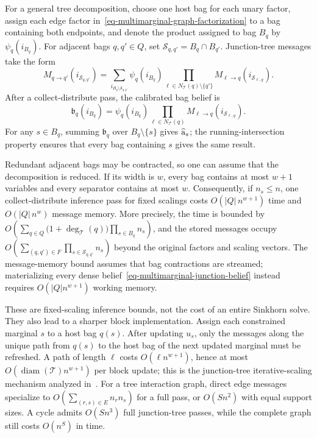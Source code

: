 For a general tree decomposition, choose one host bag for each unary factor, assign each edge factor in~\eqref{eq-multimarginal-graph-factorization} to a bag containing both endpoints, and denote the product assigned to bag $B_q$ by $\psi_q(i_{B_q})$. For adjacent bags $q,q'\in Q$, set $\mathcal S_{q,q'}=B_q\cap B_{q'}$. Junction-tree messages take the form
\begin{equation}\label{eq-multimarginal-junction-message}
	M_{q\to q'}(i_{\mathcal S_{q,q'}})
	=
	\sum_{i_{B_q\setminus\mathcal S_{q,q'}}}
	\psi_q(i_{B_q})
	\prod_{\ell\in N_{\mathcal T}(q)\setminus\{q'\}}
	M_{\ell\to q}(i_{\mathcal S_{\ell,q}}).
\end{equation}
After a collect-distribute pass, the calibrated bag belief is
\begin{equation}\label{eq-multimarginal-junction-belief}
	\mathfrak b_q(i_{B_q})
	=
	\psi_q(i_{B_q})
	\prod_{\ell\in N_{\mathcal T}(q)}
	M_{\ell\to q}(i_{\mathcal S_{\ell,q}}).
\end{equation}
For any $s\in B_q$, summing $\mathfrak b_q$ over $B_q\setminus\{s\}$ gives $\widehat{\mathrm{a}}_s$; the running-intersection property ensures that every bag containing $s$ gives the same result.

Redundant adjacent bags may be contracted, so one can assume that the decomposition is reduced. If its width is $w$, every bag contains at most $w+1$ variables and every separator contains at most $w$. Consequently, if $n_s\leq n$, one collect-distribute inference pass for fixed scalings costs
$O\!\left(|Q|\,n^{w+1}\right)$ time and $O\!\left(|Q|\,n^w\right)$ message memory.
More precisely, the time is bounded by
$O\!\left( \sum_{q\in Q} \bigl(1+\deg_{\mathcal T}(q)\bigr) \prod_{s\in B_q}n_s \right)$,
and the stored messages occupy
$O\!\left( \sum_{(q,q')\in F} \prod_{s\in\mathcal S_{q,q'}}n_s \right)$
beyond the original factors and scaling vectors. The message-memory bound assumes that bag contractions are streamed; materializing every dense belief~\eqref{eq-multimarginal-junction-belief} instead requires $O(|Q|n^{w+1})$ working memory.

These are fixed-scaling inference bounds, not the cost of an entire Sinkhorn solve. They also lead to a sharper block implementation. Assign each constrained marginal $s$ to a host bag $q(s)$. After updating $u_s$, only the messages along the unique path from $q(s)$ to the host bag of the next updated marginal must be refreshed. A path of length $\ell$ costs $O(\ell n^{w+1})$, hence at most $O(\operatorname{diam}(\mathcal T)n^{w+1})$ per block update; this is the junction-tree iterative-scaling mechanism analyzed in~\cite{HaaslerSinghZhangKarlssonChen2020PGMMOT,FanHaaslerKarlssonChen2021GraphCostMOT}. For a tree interaction graph, direct edge messages specialize to $O(\sum_{(r,s)\in E}n_rn_s)$ for a full pass, or $O(Sn^2)$ with equal support sizes. A cycle admits $O(Sn^3)$ full junction-tree passes, while the complete graph still costs $O(n^S)$ in time.

